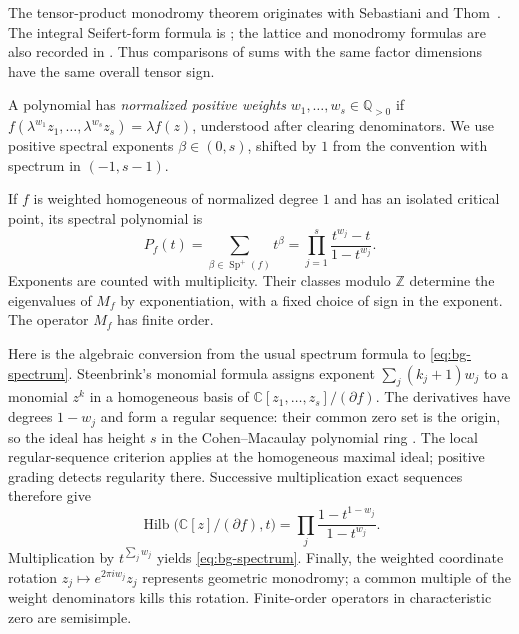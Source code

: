 The tensor-product monodromy theorem originates with
Sebastiani and Thom~\cite{SebastianiThom1971}. The integral
Seifert-form formula is \cite[Theorem~2, p.~715]{Sakamoto1974};
the lattice and monodromy formulas are also recorded in
\cite[Section~6, Equations~(6.3)--(6.5)]{BalnojanHertling2019}.
Thus comparisons of sums with the same factor dimensions have the same
overall tensor sign.

A polynomial has \emph{normalized positive weights}
$w_1,\ldots,w_s\in\mathbb Q_{>0}$ if
$f(\lambda^{w_1}z_1,\ldots,\lambda^{w_s}z_s)=\lambda f(z)$, understood
after clearing denominators.  We use positive spectral exponents
$\beta\in(0,s)$, shifted by $1$ from the convention with spectrum in
$(-1,s-1)$.

\begin{theorem}\label{bg:spectrum}
If $f$ is weighted homogeneous of normalized degree $1$ and has an isolated
critical point, its spectral polynomial is
\begin{equation}\label{eq:bg-spectrum}
 P_f(t)=\sum_{\beta\in\operatorname{Sp}^{+}(f)}t^\beta
       =\prod_{j=1}^s\frac{t^{w_j}-t}{1-t^{w_j}}.
\end{equation}
Exponents are counted with multiplicity.  Their classes modulo $\mathbb Z$
determine the eigenvalues of $M_f$ by exponentiation, with a fixed choice
of sign in the exponent.  The operator $M_f$ has finite order.
\end{theorem}

Here is the algebraic conversion from the usual spectrum formula to
\eqref{eq:bg-spectrum}.  Steenbrink's monomial formula
\cite[Section~1, Examples, p.~165]{Steenbrink1989} assigns exponent
$\sum_j(k_j+1)w_j$ to a monomial $z^k$ in a homogeneous basis of
$\mathbb C[z_1,\ldots,z_s]/(\partial f)$.
The derivatives have degrees $1-w_j$ and form a regular sequence:
their common zero set is the origin, so the ideal has height $s$ in the
Cohen--Macaulay polynomial ring
\cite[Tags~00ND and 02JN]{StacksProject}. The local regular-sequence
criterion applies at the homogeneous maximal ideal; positive grading
detects regularity there. Successive multiplication exact
sequences therefore give
\[
 \operatorname{Hilb}\bigl(\mathbb C[z]/(\partial f),t\bigr)
 =\prod_j\frac{1-t^{1-w_j}}{1-t^{w_j}}.
\]
Multiplication by $t^{\sum_jw_j}$ yields \eqref{eq:bg-spectrum}.
Finally, the weighted coordinate rotation
$z_j\mapsto e^{2\pi i w_j}z_j$ represents geometric monodromy; a common
multiple of the weight denominators kills this rotation.  Finite-order
operators in characteristic zero are semisimple.


